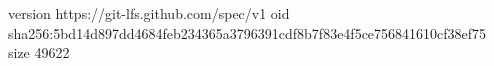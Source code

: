 version https://git-lfs.github.com/spec/v1
oid sha256:5bd14d897dd4684feb234365a3796391cdf8b7f83e4f5ce756841610cf38ef75
size 49622
